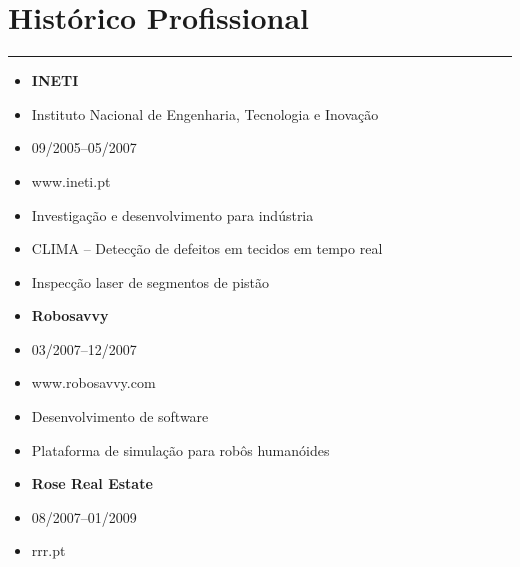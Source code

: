 \documentclass[a4paper,portuguese]{article}
\newcommand{\topic}[1]{
\section*{#1} \vspace{-6mm}
\rule{\columnwidth}{.25mm}
}
\begin{document}
\topic{Histórico Profissional}
\vspace{0.5cm}
\begin{minipage}[t]{0.5\linewidth}
    \begin{itemize}
    \setlength{\itemsep}{-1mm}
        \item[] {\bf INETI}
        \item[] Instituto Nacional de Engenharia, Tecnologia e Inovação
        \item[] 09/2005--05/2007
        \item[] www.ineti.pt
    \end{itemize}
\end{minipage}
\begin{minipage}[t]{0.5\linewidth}
    \begin{itemize}
    \setlength{\itemsep}{-1mm}
        \item[] Investigação e desenvolvimento para indústria
        \item[] CLIMA -- Detecção de defeitos em tecidos em tempo real
        \item[] Inspecção laser de segmentos de pistão
    \end{itemize}
\end{minipage}
\vspace{0.5cm}
\begin{minipage}[t]{0.5\linewidth}
    \begin{itemize}
    \setlength{\itemsep}{-1mm}
        \item[] {\bf Robosavvy}
        \item[] 03/2007--12/2007
        \item[] www.robosavvy.com
    \end{itemize}
\end{minipage}
\begin{minipage}[t]{0.5\linewidth}
    \begin{itemize}
    \setlength{\itemsep}{-1mm}
        \item[] Desenvolvimento de software
        \item[] Plataforma de simulação para robôs humanóides
    \end{itemize}
\end{minipage}
\vspace{0.5cm}
\begin{minipage}[t]{0.5\linewidth}
    \begin{itemize}
    \setlength{\itemsep}{-1mm}
        \item[] {\bf Rose Real Estate}
        \item[] 08/2007--01/2009
        \item[] rrr.pt
    \end{itemize}
\end{minipage}
\end{document}
